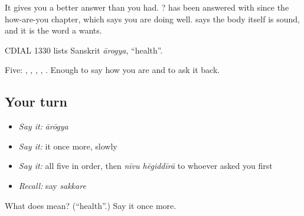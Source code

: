 It gives you a better answer than you had.  ? has been answered with  since the how-are-you chapter, which says you are doing well.  says the body itself is sound, and it is the word a  wants.

CDIAL 1330 lists Sanskrit \emph{ārogya}, \textquotedblleft{}health\textquotedblright{}.

\begin{grammarlens}[title={What you've built}]
Five: , , , , . Enough to say how you are and to ask it back.
\end{grammarlens}

\subsection*{Your turn}
\begin{itemize}
\raggedright
  \item \emph{Say it:} \emph{ārōgya}
  \item \emph{Say it:} it once more, slowly
  \item \emph{Say it:} all five in order, then \emph{nīvu hēgiddīrā} to whoever asked you first
  \item \emph{Recall:} say \emph{sakkare}
\end{itemize}

\begin{tcolorbox}[breakable,colback=teal!4,colframe=teal!35!black,title={Before you move on}]
What does  mean? (\textquotedblleft{}health\textquotedblright{}.) Say it once more.
\end{tcolorbox}
